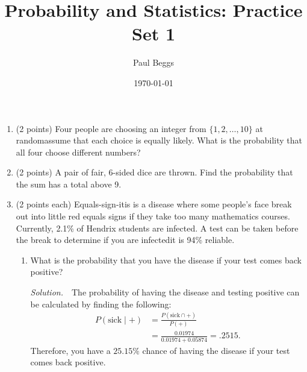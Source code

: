 \documentclass[11pt]{article}
\title{Probability and Statistics: Practice Set 1}
\author{Paul Beggs}
\date{\today}
\newenvironment{solution}
  {\textit{Solution.}}
\newcommand{\sol}[1]{
    \begin{customframedproof}[linecolor=orangehdx!75,]
        \begin{solution}
        #1
        \end{solution}
    \end{customframedproof}
}
\begin{document}
\maketitle
\begin{enumerate}
\vspace*{-0.25in}
  	\item (2 points) Four people are choosing an integer from \(\{1,2,\dots,10\}\) at random\textemdash assume that each choice is equally likely. What is the probability that all four choose different numbers?

	\item (2 points) A pair of fair, 6-sided dice are thrown. Find the probability that the sum has a total above 9.
	\item (2 points each) Equals-sign-itis is a disease where some people's face break out into little red equals signs if they take too many mathematics courses. Currently, 2.1\% of Hendrix students are infected. A test can be taken before the break to determine if you are infected\textemdash it is 94\% reliable.
	\begin{enumerate}[label=(\alph*)]
		\item What is the probability that you have the disease if your test comes back positive?
		\begin{customframedproof}[linecolor=orangehdx!75]
			\vspace*{-.8em}
			\begin{multicols}{2}
				\begin{minipage}[t]{\linewidth}
					\textit{Solution.}\ \ The probability of having the disease and testing positive can be calculated by finding the following:
					\begin{align*}
						P(\text{sick} \mid +) &= \frac{P(\text{sick} \cap +)}{P(+)} \\
						&= \frac{0.01974}{0.01974 + 0.05874} = .2515.
					\end{align*}
					Therefore, you have a \(\boxed{25.15\%}\) chance of having the disease if your test comes back positive.
				\end{minipage}


\end{multicols}
\end{customframedproof}
\end{enumerate}
\end{enumerate}
\end{document}
